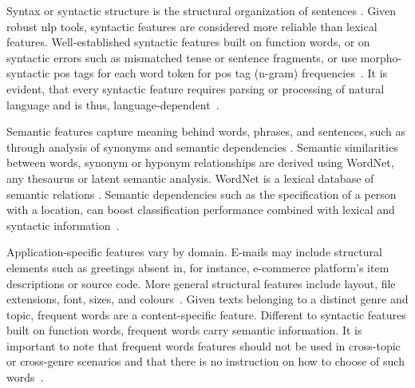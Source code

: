 \begin{table}[]
\centering
\caption{Comparison of a subset of lexical features~\citep{stamatatos_survey_2009}. Requirements refer to computational requirements such as a tokenizer.}
\label{tab:comp_lexical}
\end{table}

Syntax or syntactic structure is the structural organization of sentences \citep{kurt_pehlivanoglu_comparative_2024}.
Given robust \ac{nlp} tools, syntactic features are considered more reliable than lexical features.
Well-established syntactic features built on function words, or on syntactic errors such as mismatched tense or sentence fragments, or use morpho-syntactic \ac{pos} tags for each word token for \ac{pos} tag (n-gram) frequencies~\citep{abbasi_writeprints_2008,stamatatos_survey_2009}.
It is evident, that every syntactic feature requires parsing or processing of natural language and is thus, language-dependent~\citep{neal_surveying_2018,stamatatos_survey_2009}.

Semantic features capture meaning behind words, phrases, and sentences, such as through analysis of synonyms and semantic dependencies \citep{neal_surveying_2018}.
Semantic similarities between words, synonym or hyponym relationships are derived using WordNet, any thesaurus or latent semantic analysis.
WordNet is a lexical database of semantic relations \citep{zhou_paraphrase_2025}.
Semantic dependencies such as the specification of a person with a location, can boost classification performance combined with lexical and syntactic information~\cite{stamatatos_survey_2009}.


Application-specific features vary by domain.
E-mails may include structural elements such as greetings absent in, for instance, e-commerce platform's item descriptions or source code.
More general structural features include layout, file extensions, font, sizes, and colours~\citep{abbasi_writeprints_2008,neal_surveying_2018}.
Given texts belonging to a distinct genre and topic, frequent words are a content-specific feature.
Different to syntactic features built on function words, frequent words carry semantic information.
It is important to note that frequent words features should not be used in cross-topic or cross-genre scenarios and that there is no instruction on how to choose of such words~\citep{abbasi_writeprints_2008}.
